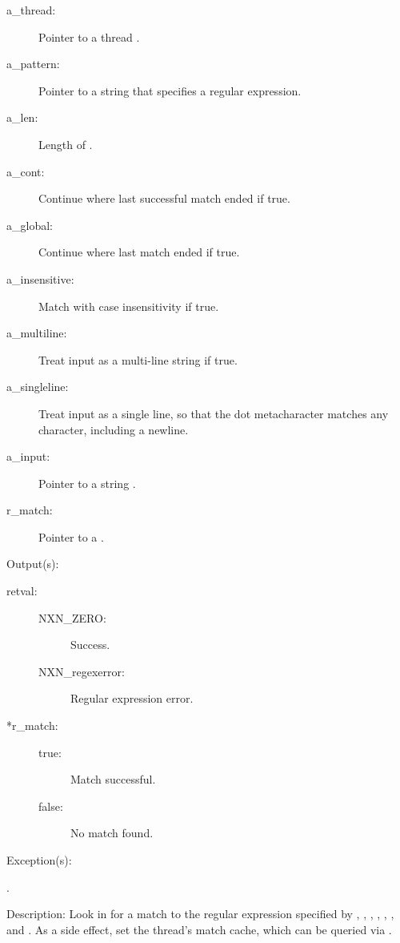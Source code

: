 \begin{capi}
\begin{capilist}
\begin{description}
		\item[a\_thread: ]
			Pointer to a thread .
		\item[a\_pattern: ]
			Pointer to a string that specifies a regular expression.
		\item[a\_len: ]
			Length of .
		\item[a\_cont: ]
			Continue where last successful match ended if true.
		\item[a\_global: ]
			Continue where last match ended if true.
		\item[a\_insensitive: ]
			Match with case insensitivity if true.
		\item[a\_multiline: ]
			Treat input as a multi-line string if true.
		\item[a\_singleline: ]
			Treat input as a single line, so that the dot
			metacharacter matches any character, including a
			newline.
		\item[a\_input: ]
			Pointer to a string .
		\item[r\_match: ]
			Pointer to a .
		\end{description}
	\item[Output(s): ]
		\begin{description}\item[]
		\item[retval: ]
			\begin{description}\item[]
			\item[NXN\_ZERO: ] Success.
			\item[NXN\_regexerror: ] Regular expression error.
			\end{description}
		\item[*r\_match: ]
			\begin{description}\item[]
			\item[true: ] Match successful.
			\item[false: ] No match found.
			\end{description}
		\end{description}
	\item[Exception(s): ]
		\begin{description}\item[]
		\item[.]
		\end{description}
	\item[Description: ]
		Look in  for a match to the regular expression
		specified by , , ,
		, , ,
		and .  As a side effect, set the thread's
		match cache, which can be queried via
		.


\end{capilist}
\end{capi}
